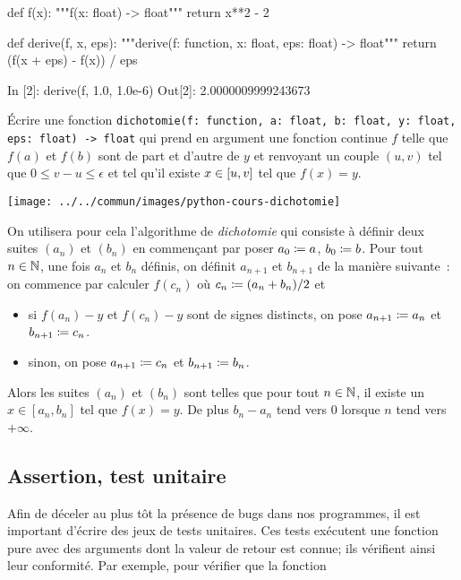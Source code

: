 \documentclass{magnolia}
\begin{document}
\begin{pythoncodeline}
def f(x):
    """f(x: float) -> float"""
    return x**2 - 2

def derive(f, x, eps):
    """derive(f: function, x: float, eps: float) -> float"""
    return (f(x + eps) - f(x)) / eps
\end{pythoncodeline}

\begin{pythoncode}
In [2]: derive(f, 1.0, 1.0e-6)
Out[2]: 2.0000009999243673
\end{pythoncode}

\begin{exoUnique}
\exo Écrire une fonction
\verb_dichotomie(f: function, a: float, b: float, y: float, eps: float) -> float_ qui prend en argument
une fonction continue $f$ telle que $f(a)$ et $f(b)$ sont de part et d'autre de $y$ et renvoyant un couple $(u,v)$ tel que $0\leq v-u\leq\epsilon$ et tel qu'il existe $x\in\left[u,v\right]$ tel que $f(x)=y$.\\
\begin{center}
  \texttt{[image: ../../commun/images/python-cours-dichotomie]}
  \end{center}
On utilisera pour cela
l'algorithme de \emph{dichotomie} qui consiste à définir deux suites $(a_n)$ et $(b_n)$ en
commençant par poser $a_0\coloneqq a$, $b_0\coloneqq b$. Pour tout $n\in\mathbb{N}$, une fois $a_n$
et $b_n$ définis, on
définit $a_{n+1}$ et $b_{n+1}$ de la manière suivante~: on commence par calculer $f(c_n)$
où $c_n\coloneqq(a_n + b_n)/2$ et
\begin{itemize}
\item si $f(a_n)-y$ et $f(c_n)-y$ sont de signes distincts, on pose $a_{n+1}\coloneqq a_n$ et $b_{n+1}\coloneqq c_n$.
\item sinon, on pose $a_{n+1}\coloneqq c_n$ et $b_{n+1}\coloneqq b_n$.
\end{itemize}
Alors les suites $(a_n)$ et $(b_n)$ sont telles que pour tout $n\in\mathbb{N}$, il existe un
$x\in[a_n,b_n]$ tel que $f(x)=y$. De plus $b_n-a_n$ tend vers 0 lorsque $n$ tend vers $+\infty$.
\end{exoUnique}

\subsection{Assertion, test unitaire}

Afin de déceler au plus tôt la présence de bugs dans nos programmes, il est important
d'écrire des jeux de tests unitaires. Ces tests exécutent une fonction pure avec
des arguments dont la valeur de retour est connue; ils vérifient ainsi leur conformité. Par exemple,
pour vérifier que la fonction
\end{document}
